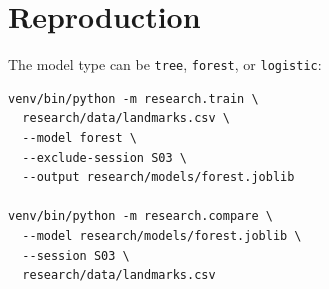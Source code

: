 \documentclass[11pt,a4paper]{article}
\begin{document}
\appendix
\section{Reproduction}

The model type can be \texttt{tree}, \texttt{forest}, or \texttt{logistic}:

\begin{lstlisting}
venv/bin/python -m research.train \
  research/data/landmarks.csv \
  --model forest \
  --exclude-session S03 \
  --output research/models/forest.joblib

venv/bin/python -m research.compare \
  --model research/models/forest.joblib \
  --session S03 \
  research/data/landmarks.csv
\end{lstlisting}
\end{document}
